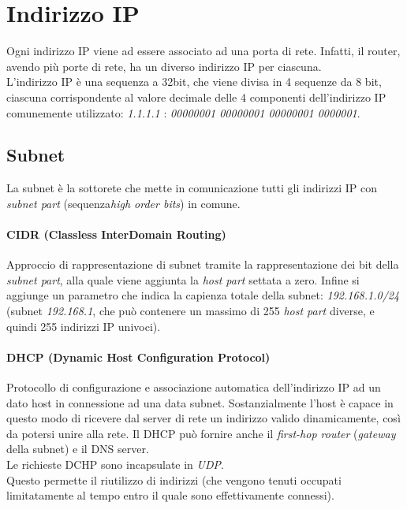 \section{Indirizzo IP}
Ogni indirizzo IP viene ad essere associato ad una porta di rete. Infatti, il router, avendo più porte di rete, ha un diverso indirizzo IP per ciascuna. \\
L'indirizzo IP è una sequenza a 32bit, che viene divisa in 4 sequenze da 8 bit, ciascuna corrispondente al valore decimale delle 4 componenti dell'indirizzo IP comunemente utilizzato: \textit{1.1.1.1} : \textit{00000001 00000001 00000001 0000001}.

\subsection{Subnet}
La subnet è la sottorete che mette in comunicazione tutti gli indirizzi IP con \textit{subnet part} (sequenza\textit{high order bits}) in comune.
\paragraph{CIDR (Classless InterDomain Routing)}
Approccio di rappresentazione di subnet tramite la rappresentazione dei bit della \textit{subnet part}, alla quale viene aggiunta la \textit{host part} settata a zero. Infine si aggiunge un parametro che indica la capienza totale della subnet: \textit{192.168.1.0/24} (subnet \textit{192.168.1}, che può contenere un massimo di 255 \textit{host part} diverse, e quindi 255 indirizzi IP univoci). \hfill \\
\paragraph{DHCP (Dynamic Host Configuration Protocol)}
Protocollo di configurazione e associazione automatica dell'indirizzo IP ad un dato host in connessione ad una data subnet.
Sostanzialmente l'host è capace in questo modo di ricevere dal server di rete un indirizzo valido dinamicamente, così da potersi unire alla rete.
Il DHCP può fornire anche il \textit{first-hop router} (\textit{gateway} della subnet) e il DNS server. \\
Le richieste DCHP sono incapsulate in \textit{UDP}. \\
Questo permette il riutilizzo di indirizzi (che vengono tenuti occupati limitatamente al tempo entro il quale sono effettivamente connessi).